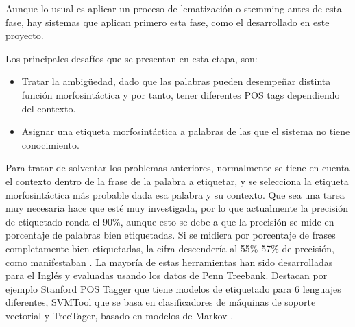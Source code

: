 Aunque lo usual es aplicar un proceso de lematización o stemming antes de esta fase, hay sistemas que aplican primero esta fase, como el desarrollado en este proyecto.\newline

Los principales desafíos que se presentan en esta etapa, son: 
\begin{itemize}
\item Tratar la ambigüedad, dado que las palabras pueden desempeñar distinta función morfosintáctica y por tanto, tener diferentes POS tags dependiendo del contexto. 
\item Asignar una etiqueta morfosintáctica a palabras de las que el sistema no tiene conocimiento.
\end{itemize}  
Para tratar de solventar los problemas anteriores, normalmente se tiene en cuenta el contexto dentro de la frase de la palabra a etiquetar, y se selecciona la etiqueta morfosintáctica más probable dada esa palabra y su contexto. \newline
Que sea una tarea muy necesaria hace que esté muy investigada, por lo que actualmente la precisión de etiquetado ronda el 90\%, aunque esto se debe a que la precisión se mide en porcentaje de palabras bien etiquetadas. Si se midiera por porcentaje de frases completamente bien etiquetadas, la cifra descendería al 55\%-57\% de precisión, como manifestaban \citet{giesbrecht2009part}. \newline
La mayoría de estas herramientas han sido desarrolladas para el Inglés y evaluadas usando los datos de \textsf{Penn Treebank}. Destacan por ejemplo \textsf{Stanford POS Tagger} que tiene modelos de etiquetado para 6 lenguajes diferentes, \textsf{SVMTool} \citet{gimenez2004svmtool} que se basa en clasificadores de máquinas de soporte vectorial  y \textsf{TreeTager}, basado en modelos de Markov \citet{schmid1995treetagger}. 
